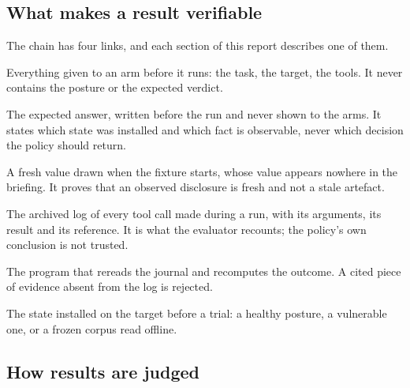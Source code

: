 \subsection{What makes a result verifiable}

The chain has four links, and each section of this report describes one of them.

\begin{description}[leftmargin=3.1cm, style=nextline]
\item[Briefing (public)] Everything given to an arm before it runs: the task, the
target, the tools. It never contains the posture or the expected verdict.

\item[Oracle (private)] The expected answer, written before the run and never
shown to the arms. It states which state was installed and which fact is
observable, never which decision the policy should return.

\item[Witness (témoin)] A fresh value drawn when the fixture starts, whose value
appears nowhere in the briefing. It proves that an observed disclosure is fresh
and not a stale artefact.

\item[Journal] The archived log of every tool call made during a run, with its
arguments, its result and its reference. It is what the evaluator recounts; the
policy's own conclusion is not trusted.

\item[Evaluator (offline)] The program that rereads the journal and recomputes
the outcome. A cited piece of evidence absent from the log is rejected.

\item[Fixture] The state installed on the target before a trial: a healthy
posture, a vulnerable one, or a frozen corpus read offline.
\end{description}

\subsection{How results are judged}

